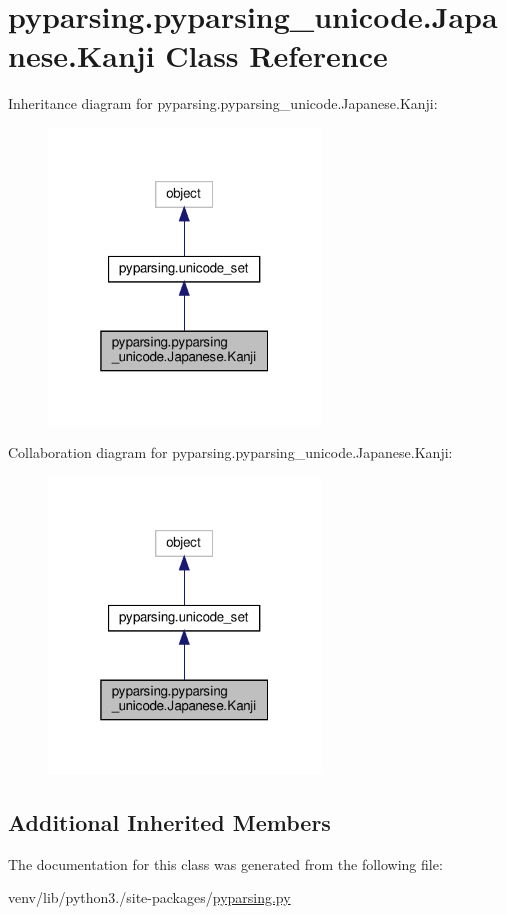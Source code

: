 \hypertarget{classpyparsing_1_1pyparsing__unicode_1_1Japanese_1_1Kanji}{}\section{pyparsing.\+pyparsing\+\_\+unicode.\+Japanese.\+Kanji Class Reference}
\label{classpyparsing_1_1pyparsing__unicode_1_1Japanese_1_1Kanji}


Inheritance diagram for pyparsing.\+pyparsing\+\_\+unicode.\+Japanese.\+Kanji\+:
\nopagebreak
\begin{figure}[H]
\begin{center}
\leavevmode
\includegraphics[width=205pt]{classpyparsing_1_1pyparsing__unicode_1_1Japanese_1_1Kanji__inherit__graph}
\end{center}
\end{figure}


Collaboration diagram for pyparsing.\+pyparsing\+\_\+unicode.\+Japanese.\+Kanji\+:
\nopagebreak
\begin{figure}[H]
\begin{center}
\leavevmode
\includegraphics[width=205pt]{classpyparsing_1_1pyparsing__unicode_1_1Japanese_1_1Kanji__coll__graph}
\end{center}
\end{figure}
\subsection*{Additional Inherited Members}


The documentation for this class was generated from the following file\+:\begin{DoxyCompactItemize}
\item 
venv/lib/python3./site-\/packages/\hyperlink{pyparsing_8py}{pyparsing.\+py}\end{DoxyCompactItemize}
